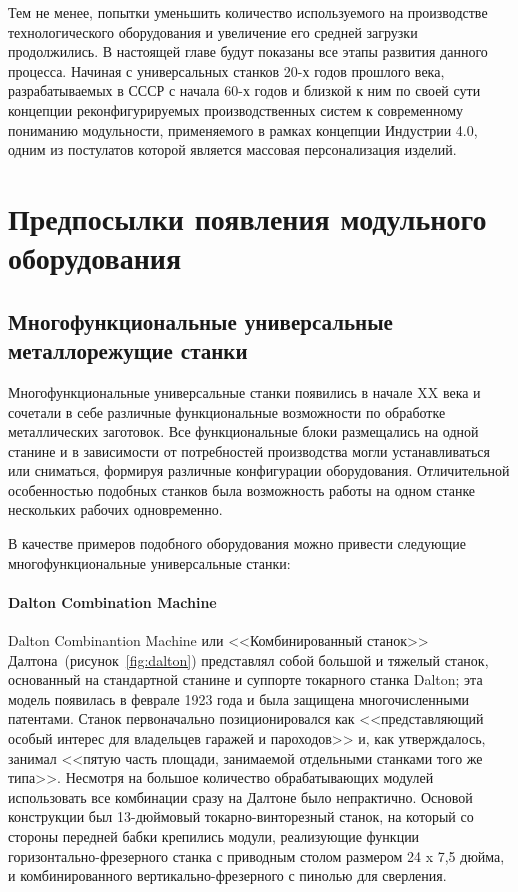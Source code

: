 Тем не менее, попытки уменьшить количество используемого на производстве технологического оборудования и увеличение его средней загрузки продолжились. В настоящей главе будут показаны все этапы развития данного процесса. Начиная с универсальных станков 20-х годов прошлого века, разрабатываемых в СССР с начала 60-х годов и близкой к ним по своей сути концепции реконфигурируемых производственных систем к современному пониманию модульности, применяемого в рамках концепции Индустрии 4.0, одним из постулатов которой является массовая персонализация изделий.

\section{Предпосылки появления модульного оборудования}

\subsection{Многофункциональные универсальные металлорежущие станки}\label{sec:ch1/multifunc-machines}

Многофункциональные универсальные станки появились в начале XX века и сочетали в себе различные функциональные возможности по обработке металлических заготовок. Все функциональные блоки размещались на одной станине и в зависимости от потребностей производства могли устанавливаться или сниматься, формируя различные конфигурации оборудования. Отличительной особенностью подобных станков была возможность работы на одном станке нескольких рабочих одновременно.

В качестве примеров подобного оборудования можно привести следующие многофункциональные универсальные станки:

\paragraph{Dalton Combination Machine}

Dalton Combinantion Machine или <<Комбинированный станок>> Далтона~(рисунок~\cref{fig:dalton}) представлял собой большой и тяжелый станок, основанный на стандартной станине и суппорте токарного станка Dalton; эта модель появилась в феврале 1923 года и была защищена многочисленными патентами. Станок первоначально позиционировался как <<представляющий особый интерес для владельцев гаражей и пароходов>> и, как утверждалось, занимал <<пятую часть площади, занимаемой отдельными станками того же типа>>. Несмотря на большое количество обрабатывающих модулей использовать все комбинации сразу на Далтоне было непрактично. Основой конструкции был 13-дюймовый токарно-винторезный станок, на который со стороны передней бабки крепились модули, реализующие функции горизонтально-фрезерного станка с приводным столом размером 24 x 7,5 дюйма, и комбинированного вертикально-фрезерного с пинолью для сверления. 

